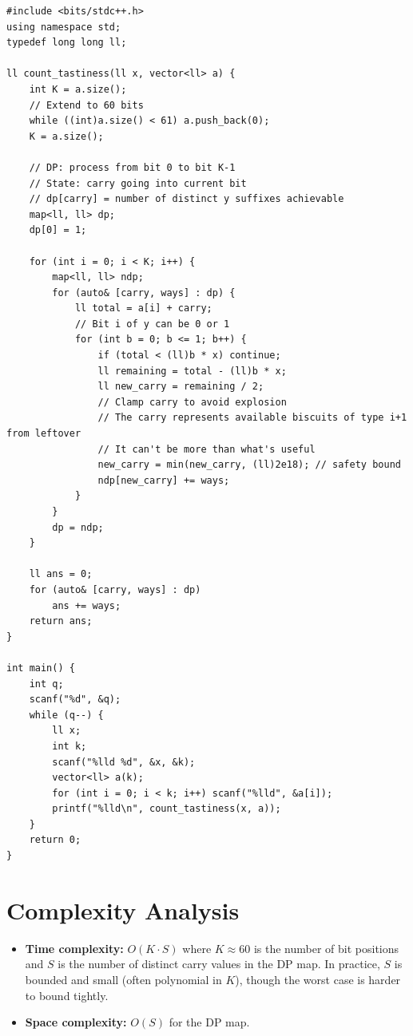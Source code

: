 \documentclass[11pt,a4paper]{article}
\begin{document}
\begin{lstlisting}
#include <bits/stdc++.h>
using namespace std;
typedef long long ll;

ll count_tastiness(ll x, vector<ll> a) {
    int K = a.size();
    // Extend to 60 bits
    while ((int)a.size() < 61) a.push_back(0);
    K = a.size();

    // DP: process from bit 0 to bit K-1
    // State: carry going into current bit
    // dp[carry] = number of distinct y suffixes achievable
    map<ll, ll> dp;
    dp[0] = 1;

    for (int i = 0; i < K; i++) {
        map<ll, ll> ndp;
        for (auto& [carry, ways] : dp) {
            ll total = a[i] + carry;
            // Bit i of y can be 0 or 1
            for (int b = 0; b <= 1; b++) {
                if (total < (ll)b * x) continue;
                ll remaining = total - (ll)b * x;
                ll new_carry = remaining / 2;
                // Clamp carry to avoid explosion
                // The carry represents available biscuits of type i+1 from leftover
                // It can't be more than what's useful
                new_carry = min(new_carry, (ll)2e18); // safety bound
                ndp[new_carry] += ways;
            }
        }
        dp = ndp;
    }

    ll ans = 0;
    for (auto& [carry, ways] : dp)
        ans += ways;
    return ans;
}

int main() {
    int q;
    scanf("%d", &q);
    while (q--) {
        ll x;
        int k;
        scanf("%lld %d", &x, &k);
        vector<ll> a(k);
        for (int i = 0; i < k; i++) scanf("%lld", &a[i]);
        printf("%lld\n", count_tastiness(x, a));
    }
    return 0;
}
\end{lstlisting}

\section{Complexity Analysis}
\begin{itemize}
  \item \textbf{Time complexity:} $O(K \cdot S)$ where $K \approx 60$ is the number of bit positions and $S$ is the number of distinct carry values in the DP map. In practice, $S$ is bounded and small (often polynomial in $K$), though the worst case is harder to bound tightly.
  \item \textbf{Space complexity:} $O(S)$ for the DP map.
\end{itemize}
\end{document}
